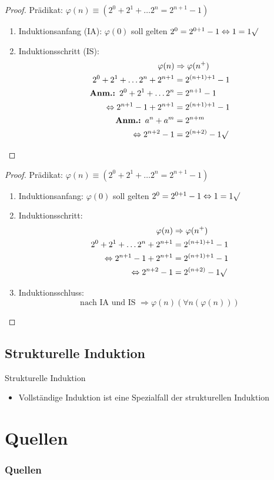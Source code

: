 \documentclass[12pt%
,aspectratio=169%
]{beamer}
\begin{document}
\begin{frame}
\begin{proof}
Prädikat: $\varphi(n) \equiv (2^0 + 2^1 + \dots 2^n = 2^{n+1}-1)$
\begin{enumerate}
	\item Induktionsanfang (IA): $\varphi(0)$ soll gelten
$2^0 = 2^{0+1}-1 \Leftrightarrow 1 = 1 \surd$\\
	\item Induktionsschritt (IS):
\begin{align*}
\varphi(n) & \Rightarrow \varphi(n^+)\\
2^0 + 2^1 + \dots 2^n + 2^{n+1} &= 2^{(n+1)+1}-1\\
\textbf{Anm.: } 2^0 + 2^1 + \dots 2^n &= 2^{n+1} -1  \\
\Leftrightarrow  2^{n+1} -1 + 2^{n+1} &= 2^{(n+1)+1}-1\\
\textbf{Anm.: } a^n + a^m &= 2^{n+m}\\
\Leftrightarrow  2^{n+2} -1 &= 2^{(n+2)}-1 \surd
\end{align*}
\end{enumerate}
\end{proof}
\end{frame}

\begin{frame}
\begin{proof}
Prädikat: $\varphi(n) \equiv (2^0 + 2^1 + \dots 2^n = 2^{n+1}-1)$
\begin{enumerate}
	\item Induktionsanfang: $\varphi(0)$ soll gelten
$2^0 = 2^{0+1}-1 \Leftrightarrow 1 = 1 \surd$\\
	\item Induktionsschritt:
\begin{align*}
\varphi(n) & \Rightarrow \varphi(n^+)\\
2^0 + 2^1 + \dots 2^n + 2^{n+1} &= 2^{(n+1)+1}-1\\
\Leftrightarrow  2^{n+1} -1 + 2^{n+1} &= 2^{(n+1)+1}-1\\
\Leftrightarrow  2^{n+2} -1 &= 2^{(n+2)}-1 \surd
\end{align*}
	\item Induktionsschluss:
$$\text{nach IA und IS } \Rightarrow \varphi(n) (\forall n(\varphi(n)))$$
\end{enumerate}
\end{proof}
\end{frame}

\subsection{Strukturelle Induktion}
\begin{frame}{Strukturelle Induktion}
\begin{itemize}
	\item Vollständige Induktion ist eine Spezialfall der strukturellen Induktion
\end{itemize}
\end{frame}






\section*{Quellen}
\appendix
\begin{frame}[allowframebreaks]
  \frametitle<presentation>{Quellen}
\printbibliography
\end{frame}
\end{document}
